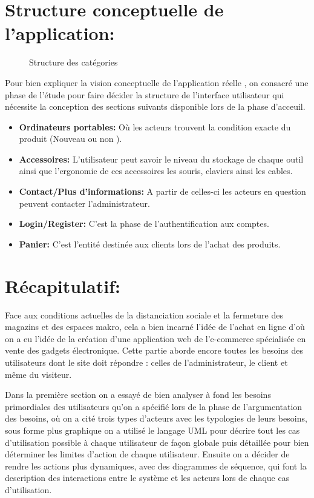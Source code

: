 \documentclass[a4paper]{report}
\begin{document}
\begin{doublespace}
	\section{Structure conceptuelle de l'application:}
	\begin{figure}[H]
		\begin{center}
			\caption{Structure des catégories}
		\end{center}
	\end{figure}
	Pour bien expliquer la vision conceptuelle de l'application
	réelle , on consacré une phase de l'étude pour faire décider la structure de
	l'interface utilisateur  qui nécessite la conception des  sections suivants
	disponible lors de la phase d'acceuil.
	\begin{itemize}
		\item \textbf{Ordinateurs portables:} Où les acteurs
		      trouvent la condition exacte du produit (Nouveau ou non ).
		\item \textbf{Accessoires:} L'utilisateur peut savoir
		      le niveau du stockage de chaque outil ainsi que l'ergonomie de ces accessoires
		      les souris, claviers ainsi les cables.
		\item \textbf{Contact/Plus d'informations:} A partir de
		      celles-ci les acteurs en question peuvent contacter l'administrateur.
		\item \textbf{Login/Register:} C'est la phase de
		      l'authentification aux comptes.
		\item \textbf{Panier:} C'est l'entité destinée aux
		      clients lors de l'achat des produits.

	\end{itemize}

	\newpage
	\section{Récapitulatif:}
	Face aux conditions actuelles de la distanciation sociale
	et la fermeture des magazins et des espaces makro, cela a bien incarné l'idée
	de l'achat en ligne d'où on a eu l'idée de la création d’une application web de
	l'e-commerce spécialisée en vente des gadgets électronique. Cette partie aborde
	encore toutes les besoins des utilisateurs dont le site doit répondre : celles
	de l’administrateur, le client	et même du visiteur.

	Dans la première section on a essayé de bien analyser à
	fond les besoins primordiales des utilisateurs qu'on a spécifié lors de la
	phase de l'argumentation des besoins, où on a cité trois types d'acteurs avec
	les typologies de leurs besoins, sous forme plus graphique on a utilisé le
	langage UML pour décrire tout les cas d'utilisation possible à chaque
	utilisateur de façon globale puis  détaillée pour bien déterminer les limites
	d'action de chaque utilisateur.
	Ensuite on a décider de rendre les actions plus dynamiques,
	avec des diagrammes de séquence, qui font la description des interactions entre
	le système et les acteurs lors de chaque cas d'utilisation.


\end{doublespace}
\end{document}
